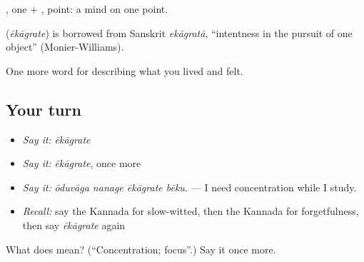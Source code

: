 , one + , point: a mind on one point.

\begin{cousinweb}
\textbf{} (\emph{ēkāgrate}) is borrowed from Sanskrit \emph{ekāgratā}, \textquotedblleft{}intentness in the pursuit of one object\textquotedblright{} (Monier-Williams).
\end{cousinweb}

\begin{grammarlens}[title={What you've built}]
One more word for describing what you lived and felt.
\end{grammarlens}

\subsection*{Your turn}
\begin{itemize}
\raggedright
  \item \emph{Say it:} \emph{ēkāgrate}
  \item \emph{Say it:} \emph{ēkāgrate}, once more
  \item \emph{Say it:} \emph{ōduvāga nanage ēkāgrate bēku.} — I need concentration while I study.
  \item \emph{Recall:} say the Kannada for slow-witted, then the Kannada for forgetfulness, then say \emph{ēkāgrate} again
\end{itemize}

\begin{tcolorbox}[breakable,colback=teal!4,colframe=teal!35!black,title={Before you move on}]
What does  mean? (\textquotedblleft{}Concentration; focus\textquotedblright{}.) Say it once more.
\end{tcolorbox}
